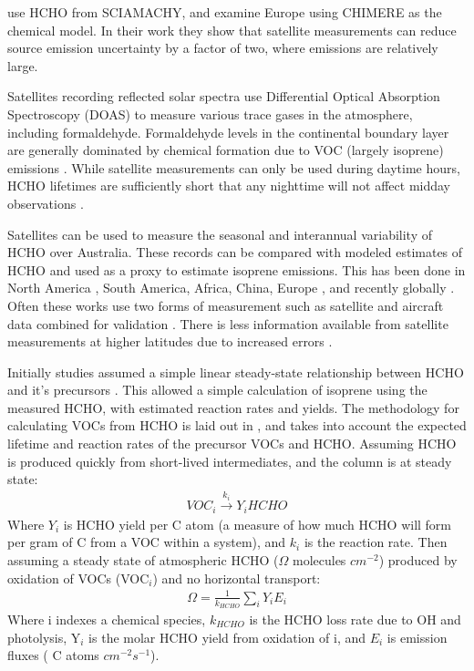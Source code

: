     \citet{Dufour2009} use HCHO from SCIAMACHY, and examine Europe using CHIMERE as the chemical model. 
    In their work they show that satellite measurements can reduce source emission uncertainty by a factor of two, where emissions are relatively large.
    
    Satellites recording reflected solar spectra use Differential Optical Absorption Spectroscopy (DOAS) to measure various trace gases in the atmosphere, including formaldehyde. 
    Formaldehyde levels in the continental boundary layer are generally dominated by chemical formation due to VOC (largely isoprene) emissions \citep{Kefauver2014}.
    While satellite measurements can only be used during daytime hours, HCHO lifetimes are sufficiently short that any nighttime will not affect midday observations \citep{Wolfe2016}.
    
    Satellites can be used to measure the seasonal and interannual variability of HCHO over Australia.
    These records can be compared with modeled estimates of HCHO and used as a proxy to estimate isoprene emissions.
    This has been done in North America \citep{Palmer2003, Millet2006}, South America, Africa, China, Europe \citep{Dufour2009}, and recently globally \citep{FortemsCheiney2012, Bauwens2016}.
    Often these works use two forms of measurement such as satellite and aircraft data combined for validation \citep{Marais2014}.
    There is less information available from satellite measurements at higher latitudes due to increased errors \citep{DeSmedt2015}.
    
    Initially studies assumed a simple linear steady-state relationship between HCHO and it's precursors \citep{Palmer2003, Palmer2006, Millet2006}.
    This allowed a simple calculation of isoprene using the measured HCHO, with estimated reaction rates and yields.
    The methodology for calculating VOCs from HCHO is laid out in \citet{Palmer2003}, and takes into account the expected lifetime and reaction rates of the precursor VOCs and HCHO.
    Assuming HCHO is produced quickly from short-lived intermediates, and the column is at steady state:
    \begin{eqnarray*}
    VOC_i \overset{k_i}{\rightarrow} Y_i HCHO
    \end{eqnarray*}
    Where $Y_i$ is HCHO yield per C atom (a measure of how much HCHO will form per gram of C from a VOC within a system), and $k_i$ is the reaction rate.
    Then assuming a steady state of atmospheric HCHO ($\Omega$ molecules $cm^{-2}$) produced by oxidation of VOCs (VOC$_i$) and no horizontal transport:
    \begin{eqnarray*}
    \Omega = \frac{1}{k_{HCHO}} \sum_{i} Y_i E_i
    \end{eqnarray*}
    Where i indexes a chemical species, $k_{HCHO}$ is the HCHO loss rate due to OH and photolysis, Y$_i$ is the molar HCHO yield from oxidation of i, and $E_i$ is emission fluxes ( C atoms $cm^{-2}s^{-1}$).
    
